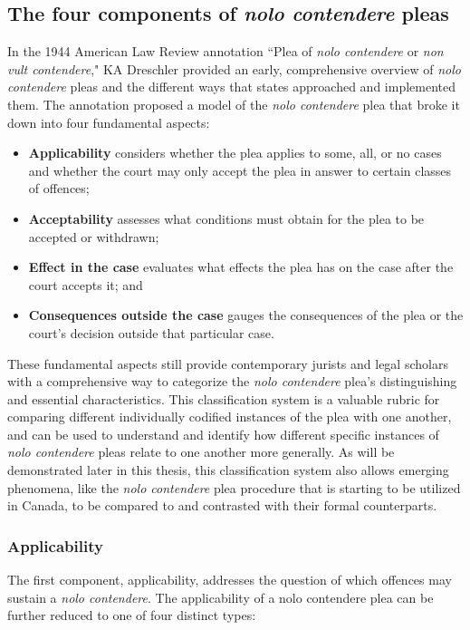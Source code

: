 \subsection{The four components of \textit{nolo contendere} pleas}

In the 1944 American Law Review annotation ``Plea of \textit{nolo contendere} or \textit{non vult contendere}," KA Dreschler provided an early, comprehensive overview of \textit{nolo contendere} pleas and the different ways that states approached and implemented them. The annotation proposed a model of the \textit{nolo contendere} plea that broke it down into four fundamental aspects:

\begin{itemize}
    \item \textbf{Applicability} considers whether the plea applies to some, all, or no cases and whether the court may only accept the plea in answer to certain classes of offences;
    \item \textbf{Acceptability} assesses what conditions must obtain for the plea to be accepted or withdrawn;
    \item \textbf{Effect in the case} evaluates what effects the plea has on the case after the court accepts it; and
    \item \textbf{Consequences outside the case} gauges the consequences of the plea or the court's decision outside that particular case.
\end{itemize}

These fundamental aspects still provide contemporary jurists and legal scholars with a comprehensive way to categorize the \textit{nolo contendere} plea's distinguishing and essential characteristics. This classification system is a valuable rubric for comparing different individually codified instances of the plea with one another, and can be used to understand and identify how different specific instances of \textit{nolo contendere} pleas relate to one another more generally. As will be demonstrated later in this thesis, this classification system also allows emerging phenomena, like the \textit{nolo contendere} plea procedure that is starting to be utilized in Canada, to be compared to and contrasted with their formal counterparts.

\subsubsection{Applicability}

The first component, applicability, addresses the question of which offences may sustain a \textit{nolo contendere}. The applicability of a nolo contendere plea can be further reduced to one of four distinct types:

